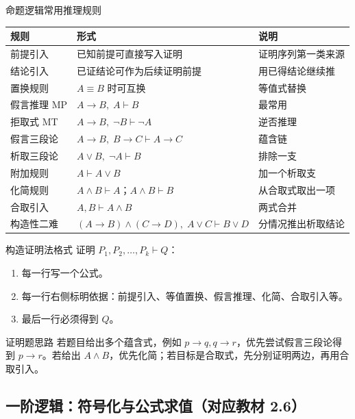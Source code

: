 \documentclass[UTF8,zihao=-4]{ctexart}
\begin{document}
\begin{corebox}{命题逻辑常用推理规则}
\begin{center}
\begin{tabularx}{\textwidth}{p{3.1cm}p{5.2cm}X}
\toprule
规则 & 形式 & 说明 \\
\midrule
前提引入 & 已知前提可直接写入证明 & 证明序列第一类来源 \\
结论引入 & 已证结论可作为后续证明前提 & 用已得结论继续推 \\
置换规则 & $A\equiv B$ 时可互换 & 等值式替换 \\
假言推理 MP & $A\to B,\;A\vdash B$ & 最常用 \\
拒取式 MT & $A\to B,\;\neg B\vdash \neg A$ & 逆否推理 \\
假言三段论 & $A\to B,\;B\to C\vdash A\to C$ & 蕴含链 \\
析取三段论 & $A\lor B,\;\neg A\vdash B$ & 排除一支 \\
附加规则 & $A\vdash A\lor B$ & 加一个析取支 \\
化简规则 & $A\land B\vdash A$；$A\land B\vdash B$ & 从合取式取出一项 \\
合取引入 & $A,B\vdash A\land B$ & 两式合并 \\
构造性二难 & $(A\to B)\land(C\to D),\;A\lor C\vdash B\lor D$ & 分情况推出析取结论 \\
\bottomrule
\end{tabularx}
\end{center}
\end{corebox}

\begin{methodbox}{构造证明法格式}
证明 $P_1,P_2,\ldots,P_k\vdash Q$：
\begin{enumerate}
  \item 每一行写一个公式。
  \item 每一行右侧标明依据：前提引入、等值置换、假言推理、化简、合取引入等。
  \item 最后一行必须得到 $Q$。
\end{enumerate}
\end{methodbox}

\begin{exambox}{证明题思路}
若题目给出多个蕴含式，例如 $p\to q,q\to r$，优先尝试假言三段论得到 $p\to r$。若给出 $A\land B$，优先化简；若目标是合取式，先分别证明两边，再用合取引入。
\end{exambox}

\subsection{一阶逻辑：符号化与公式求值（对应教材 2.6）}
\end{document}
